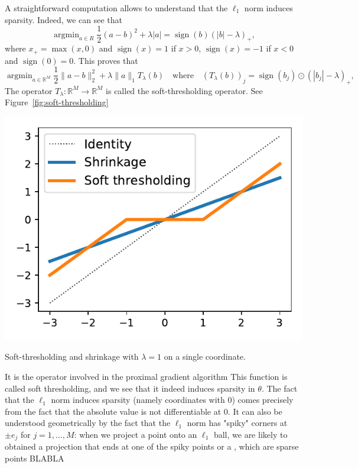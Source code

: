 \documentclass[
	fontsize=11pt, %
	twoside=false, %
	numbers=noenddot, %
]{kaobook}
\DeclareMathOperator*{\argmin}{argmin}
\newcommand{\R}{\mathbb R}
\newcommand{\norm}[1]{\| #1 \|}
\DeclareMathOperator{\sign}{sign}
\begin{document}
A straightforward computation allows to understand that the $\ell_1$ norm induces sparsity.
Indeed, we can see that%
\begin{equation}
	\label{eq:soft-thresholding1}
	\argmin_{a \in R} \frac12 (a - b)^2 + \lambda |a| 
	= \sign(b) (|b| - \lambda)_+,
\end{equation}
where $x_+ = \max(x, 0)$ and $\sign(x) = 1$ if $x > 0$, $\sign(x) = -1$ if $x < 0$ and $\sign(0) = 0$.
This proves that%
\begin{equation}
	\label{eq:soft-thresholding2}
	\argmin_{a \in \R^M} \frac12 \norm{a - b}_2^2 + \lambda \norm{a}_1 
	T_\lambda(b) \quad \text{where} \quad 
	(T_\lambda(b))_j = \sign(b_j) \odot (|b_j| - \lambda)_+,
\end{equation}
The operator $T_\lambda : \R^M \rightarrow \R^M$ is called the soft-thresholding operator.
See Figure~\ref{fig:soft-thresholding}
\begin{marginfigure}
	\includegraphics{assets/soft_thresholding.pdf}
	\caption{Soft-thresholding and shrinkage with $\lambda = 1$ on a single coordinate.}
	\label{fig:soft-thresholding}
\end{marginfigure}


It is the operator involved in the proximal gradient algorithm
This function is called soft thresholding, and we see that it indeed induces sparsity in $\theta$.
The fact that the $\ell_1$ norm induces sparsity (namely coordinates with 0) comes precisely from the fact that the absolute value is not differentiable at $0$.
It can also be understood geometrically by the fact that the $\ell_1$ norm has "spiky" corners at $\pm e_j$ for $j=1, \ldots, M$: when we project a point onto an $\ell_1$ ball, we are likely to obtained a projection that ends at one of the spiky points or a , which are sparse points  BLABLA
\end{document}
